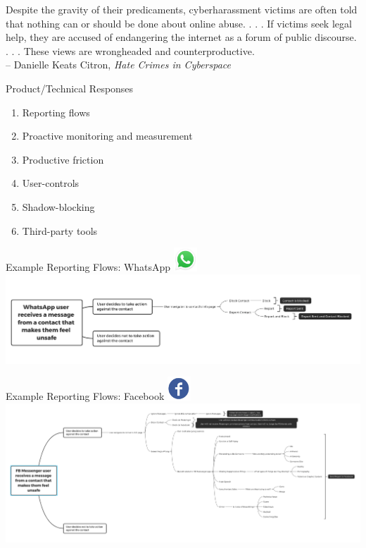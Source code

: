 \documentclass[nobackground,dvipsnames,table]{beamer}
\begin{document}
\begin{frame}{}
    Despite the gravity of their predicaments, cyberharassment victims are often told that nothing can or should be done about online abuse. . . . If victims seek legal help, they are accused of endangering the internet as a forum of public discourse. . . . These views are wrongheaded and counterproductive.\\
    – Danielle Keats Citron, \textit{Hate Crimes in Cyberspace}
\end{frame}

\begin{frame}{Product/Technical Responses}
    \begin{enumerate}
        \item Reporting flows
        \item Proactive monitoring and measurement
        \item Productive friction
        \item User-controls
        \item Shadow-blocking
        \item Third-party tools
    \end{enumerate}
\end{frame}

\begin{frame}{Example Reporting Flows: WhatsApp}
    \centering
    \includegraphics[width=25pt]{whatsapp}
    \includegraphics[width=\textwidth]{whatsapp-reporting-flow}
\end{frame}

\begin{frame}{Example Reporting Flows: Facebook}
    \centering
    \includegraphics[width=25pt]{facebook}
    \includegraphics[width=\textwidth]{facebook-reporting-flow}
\end{frame}
\end{document}
